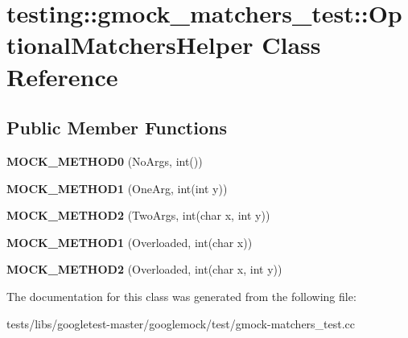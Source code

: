 \hypertarget{classtesting_1_1gmock__matchers__test_1_1OptionalMatchersHelper}{}\section{testing\+:\+:gmock\+\_\+matchers\+\_\+test\+:\+:Optional\+Matchers\+Helper Class Reference}
\label{classtesting_1_1gmock__matchers__test_1_1OptionalMatchersHelper}
\subsection*{Public Member Functions}
\begin{DoxyCompactItemize}
\item 
\mbox{\label{classtesting_1_1gmock__matchers__test_1_1OptionalMatchersHelper_a8e2a60b72259529d2b6c0f37ac47dde9}} 
{\bfseries M\+O\+C\+K\+\_\+\+M\+E\+T\+H\+O\+D0} (No\+Args, int())
\item 
\mbox{\label{classtesting_1_1gmock__matchers__test_1_1OptionalMatchersHelper_ab35fac331bbcf18e1a7e95305d4cc34d}} 
{\bfseries M\+O\+C\+K\+\_\+\+M\+E\+T\+H\+O\+D1} (One\+Arg, int(int y))
\item 
\mbox{\label{classtesting_1_1gmock__matchers__test_1_1OptionalMatchersHelper_a51f6da96a6607d70c8ea6d5f4aedb39f}} 
{\bfseries M\+O\+C\+K\+\_\+\+M\+E\+T\+H\+O\+D2} (Two\+Args, int(char x, int y))
\item 
\mbox{\label{classtesting_1_1gmock__matchers__test_1_1OptionalMatchersHelper_a782311cb85f341cf6b45f0b9f015e779}} 
{\bfseries M\+O\+C\+K\+\_\+\+M\+E\+T\+H\+O\+D1} (Overloaded, int(char x))
\item 
\mbox{\label{classtesting_1_1gmock__matchers__test_1_1OptionalMatchersHelper_a2051b793f9f68027e8861ec999739b9a}} 
{\bfseries M\+O\+C\+K\+\_\+\+M\+E\+T\+H\+O\+D2} (Overloaded, int(char x, int y))
\end{DoxyCompactItemize}


The documentation for this class was generated from the following file\+:\begin{DoxyCompactItemize}
\item 
tests/libs/googletest-\/master/googlemock/test/gmock-\/matchers\+\_\+test.\+cc\end{DoxyCompactItemize}
